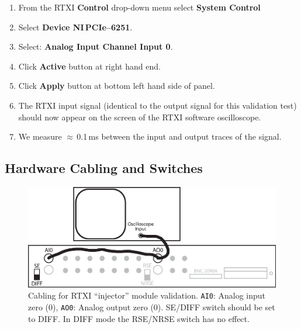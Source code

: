 \documentclass[12pt]{article}
\begin{document}
\begin{enumerate}
	\item From the RTXI {\bf Control} drop-down menu select {\bf System Control}
	\item Select {\bf Device  NI\,PCIe--6251}.
	\item Select: {\bf Analog Input Channel Input 0}.
	\item Click {\bf Active} button at right hand end.
	\item Click {\bf Apply} button at bottom left hand side of panel.
	\item The RTXI input signal (identical to the output signal for this validation test) should now appear 
	on the screen of the RTXI software oscilloscope.
	\item We measure $\approx$\,0.1\,ms between the input and output traces of the signal.
\end{enumerate}

\subsection*{Hardware Cabling and Switches}

\begin{figure}[h]
  \centering
    \includegraphics[scale=0.75]{figures/rtxi-connector-backpanel.eps}
    \caption{Cabling for RTXI ``injector'' module validation. {\tt AI0}: Analog input zero (0), {\tt AO0}: Analog output zero (0). SE/DIFF switch should be set to DIFF. In DIFF mode the RSE/NRSE switch has no effect.}
  \label{fig:rtxi-inj}
\end{figure}
\end{document}
